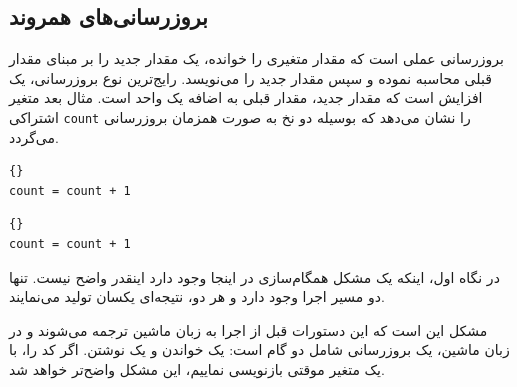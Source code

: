 \documentclass{book}
\begin{document}
\subsection {بروزرسانی‌های همروند}

    بروزرسانی عملی است که مقدار متغیری را خوانده، یک مقدار جدید را بر مبنای مقدار قبلی محاسبه نموده و سپس مقدار جدید را می‌نویسد. 
    رایج‌ترین نوع بروزرسانی، یک افزایش  است که مقدار جدید، مقدار قبلی به اضافه یک واحد است. 
    مثال بعد متغیر اشتراکی \texttt{count} را نشان می‌دهد که بوسیله دو نخ به صورت همزمان بروزرسانی می‌گردد. 

\begin{latin}
\begin{minipage}[t]{2in}
\begin{latin}
\begin{lstlisting}[title=\rl{نخ \lr{A}}]{}
count = count + 1
\end{lstlisting}
\end{latin}
\end{minipage}
\hfill
\begin{minipage}[t]{2in}
\begin{latin}
\begin{lstlisting}[title=\rl{نخ \lr{B}}]{}
count = count + 1
\end{lstlisting}
\end{latin}
\end{minipage}
\end{latin}

    در نگاه اول، اینکه یک مشکل همگام‌سازی در اینجا وجود دارد اینقدر واضح نیست. 
    تنها دو مسیر اجرا وجود دارد و هر دو، نتیجه‌ای یکسان تولید می‌نمایند. 
    
    مشکل این است که این دستورات قبل از اجرا به زبان ماشین ترجمه می‌شوند و در زبان ماشین، یک بروزرسانی شامل دو گام است: یک خواندن 
    و یک نوشتن. اگر کد را، با یک متغیر موقتی  بازنویسی نماییم، این مشکل واضح‌تر خواهد شد. 
\end{document}
